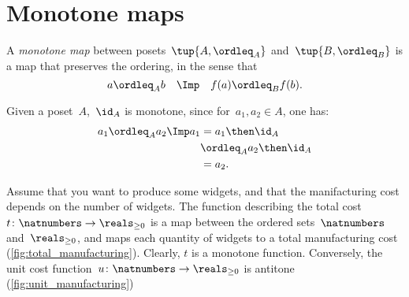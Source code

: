 
\section{Monotone maps}

\begin{definition}
  A \emph{monotone map} between posets~$\tup{A, \ordleq_A}$ and~$\tup{B, \ordleq_B}$ is a map that preserves the ordering, in the sense that
  \begin{equation}
    a \ordleq_A b \quad \Imp \quad f(a) \ordleq_B f(b).
  \end{equation}
\end{definition}
\begin{remark}
  Given a poset~$A$,~$\id_A$ is monotone, since for~$a_1,a_2\in A$, one has:
  \begin{equation}
    \begin{aligned}
      a_1\ordleq_A a_2 \Imp a_1&=a_1\then \id_A\\
      &\ordleq_A a_2\then \id_A \\
      &= a_2.
    \end{aligned}
  \end{equation}
\end{remark}


\begin{comment}
  A monotone map is an \emph{order isomorphism} if the other direction
  of the implication holds as well:
  \begin{equation}
    a \leq_A b \quad \Leftrightarrow \quad f(a) \leq_B f(b).
  \end{equation}
\end{comment}

\begin{example}
  Assume that you want to produce some widgets, and that the manifacturing cost depends on the number of widgets.
  The function describing the total cost~$t\colon \natnumbers\to \reals_{\geq 0}$ is a map between the ordered sets~$\natnumbers$ and~$\reals_{\geq 0}$, and maps each quantity of widgets to a total manufacturing cost (\cref{fig:total_manufacturing}).
  Clearly, $t$ is a monotone function.
  Conversely, the unit cost function~$u\colon \natnumbers\to \reals_{\geq 0}$ is antitone (\cref{fig:unit_manufacturing})

\end{example}

